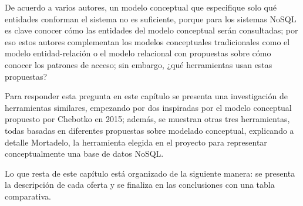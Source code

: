 De acuerdo a varios autores\cite{chebotko_big_2015,de_lima_workload-driven_2015,mior_nose_2017-1}, un modelo conceptual que especifique solo qué entidades conforman el sistema no es suficiente, porque para los sistemas NoSQL es clave conocer cómo las entidades del modelo conceptual serán consultadas; por eso estos autores complementan los modelos conceptuales tradicionales como el modelo entidad-relación o el modelo relacional con propuestas sobre cómo conocer los patrones de acceso; sin embargo, ¿qué herramientas usan estas propuestas?


Para responder esta pregunta en este capítulo se presenta una investigación de herramientas similares, empezando por dos inspiradas por el modelo conceptual propuesto por Chebotko en 2015; además, se muestran otras tres herramientas, todas basadas en diferentes propuestas sobre modelado conceptual, explicando a detalle Mortadelo, la herramienta elegida en el proyecto para representar conceptualmente una base de datos NoSQL.


Lo que resta de este capítulo está organizado de la siguiente manera: se presenta la descripción de cada oferta y se finaliza en las conclusiones con una tabla comparativa.







